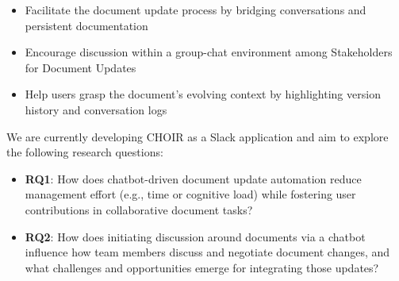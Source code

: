 \documentclass[sigconf,screen]{acmart}
\begin{document}
\begin{itemize}
    \item {Facilitate the document update process by bridging  conversations and persistent documentation}
    \item {Encourage discussion within a group-chat environment among Stakeholders for Document Updates}
    \item {Help users grasp the document's evolving context by highlighting version history and conversation logs}
\end{itemize}

We are currently developing CHOIR as a Slack application and aim to explore the following research questions:

\begin{itemize}
    \item {\textbf{RQ1}: How does chatbot-driven document update automation reduce management effort (e.g., time or cognitive load) while fostering user contributions in collaborative document tasks?}
    \item {\textbf{RQ2}: How does initiating discussion around documents via a chatbot influence how team members discuss and negotiate document changes, and what challenges and opportunities emerge for integrating those updates?}
\end{itemize}
\end{document}
